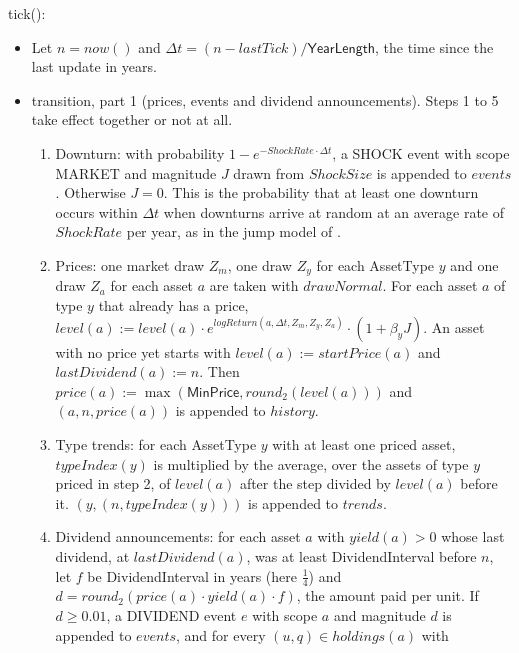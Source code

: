 \documentclass[12pt, titlepage]{article}
\begin{document}
\noindent tick():
\begin{itemize}
\item Let $n = \mathit{now}()$ and $\Delta t = (n -
  \mathit{lastTick}) / \textsf{YearLength}$, the time since the last update
  in years.
\item transition, part 1 (prices, events and dividend announcements). Steps
  1 to 5 take effect together or not at all.
  \begin{enumerate}
  \item Downturn: with probability $1 - e^{-\mathit{ShockRate} \cdot \Delta
    t}$, a SHOCK event with scope MARKET and magnitude $J$ drawn from
    $\mathit{ShockSize}$ is appended to $\mathit{events}$. Otherwise $J = 0$.
    This is the probability that at least one downturn occurs within $\Delta
    t$ when downturns arrive at random at an average rate of
    $\mathit{ShockRate}$ per year, as in the jump model of
    \citet{Merton1976}.
  \item Prices: one market draw $Z_m$, one draw $Z_y$ for each AssetType $y$
    and one draw $Z_a$ for each asset $a$ are taken with
    $\mathit{drawNormal}$. For each asset $a$ of type $y$ that already has a
    price, $\mathit{level}(a) := \mathit{level}(a) \cdot
    e^{\mathit{logReturn}(a, \Delta t, Z_m, Z_y, Z_a)} \cdot (1 + \beta_y
    J)$. An asset with no price yet starts with $\mathit{level}(a) :=
    \mathit{startPrice}(a)$ and $\mathit{lastDividend}(a) := n$. Then
    $\mathit{price}(a) := \max(\textsf{MinPrice},
    \mathit{round}_2(\mathit{level}(a)))$ and $(a, n, \mathit{price}(a))$
    is appended to $\mathit{history}$.
  \item Type trends: for each AssetType $y$ with at least one priced asset,
    $\mathit{typeIndex}(y)$ is multiplied by the average, over the assets of
    type $y$ priced in step 2, of $\mathit{level}(a)$ after the step divided
    by $\mathit{level}(a)$ before it. $(y, (n, \mathit{typeIndex}(y)))$ is
    appended to $\mathit{trends}$.
  \item Dividend announcements: for each asset $a$ with $\mathit{yield}(a) >
    0$ whose last dividend, at $\mathit{lastDividend}(a)$, was at least
    \textsf{DividendInterval} before $n$, let $f$ be
    \textsf{DividendInterval} in years (here $\frac{1}{4}$) and $d =
    \mathit{round}_2(\mathit{price}(a) \cdot \mathit{yield}(a) \cdot f)$, the
    amount paid per unit. If $d \geq 0.01$, a
    DIVIDEND event $e$ with scope $a$ and magnitude $d$ is appended to
    $\mathit{events}$, and for every $(u, q) \in \mathit{holdings}(a)$ with

\end{enumerate}
\end{itemize}
\end{document}
